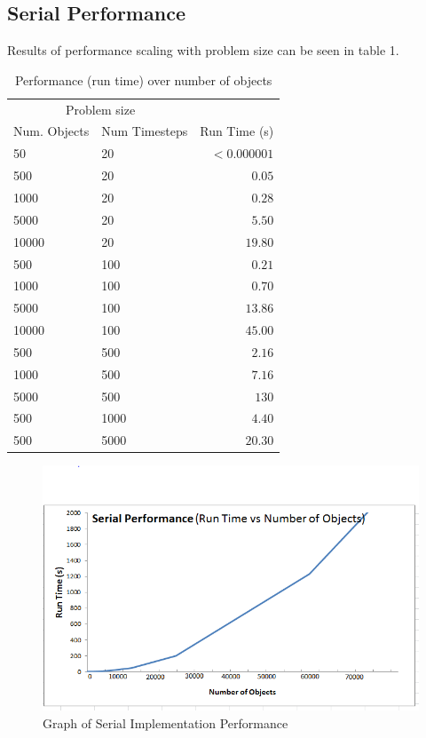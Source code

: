 \documentclass[twoside,twocolumn]{article}
\begin{document}
	\subsection{Serial Performance}
	Results of performance scaling with problem size can be seen in table 1. \newline
	\begin{table}[H]
		\caption{Performance (run time) over number of objects}
		\centering
		\begin{tabular}{llr}
			\toprule
			\multicolumn{2}{c}{Problem size} \\
			\cmidrule(r){1-2}
			Num. Objects & Num Timesteps & Run Time (s) \\
			\midrule
			50 & 20 & $< 0.000001$ \\
			500 & 20 & $0.05$ \\
			1000 & 20 & $0.28$ \\
			5000 & 20 & $5.50$ \\
			10000 & 20 & $19.80$ \\
			500 & 100 & $0.21$ \\
			1000 & 100 & $0.70$ \\
			5000 & 100 & $13.86$ \\
			10000 & 100 & $45.00$ \\
			500 & 500 & $2.16$ \\
			1000 & 500 & $7.16$ \\
			5000 & 500 & $130$ \\
			500 & 1000 & $4.40$ \\
			500 & 5000 & $20.30$ \\
			\bottomrule
		\end{tabular}
	\end{table}	
	
	\begin{figure}[H]
		\caption{Graph of Serial Implementation Performance}
		\includegraphics[scale=.6]{serial.png}
	\end{figure}
\clearpage
\end{document}
